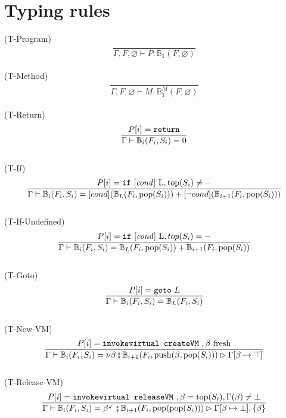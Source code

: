 \documentclass{amsart}
\newcommand{\bB}[1]{\mathbb{B}_{#1}}
\renewcommand{\emptyset}{\varnothing}
\numberwithin{equation}{section}
\theoremstyle{plain} %
\theoremstyle{definition}
\theoremstyle{remark}
\begin{document}
\section{Typing rules}
(T-Program)
\begin{equation*}
\frac{}
{\Gamma, F,\emptyset \vdash P: \bB{1}(F, \emptyset)}
\end{equation*}
\\
(T-Method)
\begin{equation*}
\frac{} %
{\Gamma, F,\emptyset \vdash M: \bB{1}^M(F, \emptyset)}
\end{equation*}
\\
(T-Return)
\begin{equation*}
\frac{P[i] = \text{\texttt{return}}}
{\Gamma \vdash \bB{i}(F_i, S_i) = 0}
\end{equation*}
\\
(T-If)
\begin{equation*}\frac{P[i] = \text{\texttt{if} [\emph{cond}] L}, \text{top}(S_i) \neq -}
{\Gamma \vdash \bB{i}(F_i, S_i) = [cond] (\bB{L}(F_i, \text{pop}(S_i))) +
 [\neg cond] (\bB{i+1}(F_i, \text{pop}(S_i)))}
\end{equation*}
\\
(T-If-Undefined)
\begin{equation*}\frac{P[i] = \text{\texttt{if} [\emph{cond}] L}, top(S_i) = -}
{\Gamma \vdash \bB{i}(F_i, S_i) = \bB{L}(F_i, \text{pop}(S_i)) + \bB{i+1}(F_i, \text{pop}(S_i))}
\end{equation*}
\\
(T-Goto)
\begin{equation*}
\frac{P[i] = \text{\texttt{goto} $L$}}
{\Gamma \vdash \bB{i}(F_i, S_i) = \bB{L}(F_i, S_i)}
\end{equation*}
\\
(T-New-VM)
\begin{equation*}\frac{
P[i] = \text{\texttt{invokevirtual createVM} }, \beta \text{ fresh}}
{\Gamma \vdash \bB{i}(F_i, S_i) = \nu \beta \fatsemi \bB{i+1}(F_i, \text{push}(\beta,\text{pop}(S_i))) \rhd \Gamma[\beta \mapsto \top]}
\end{equation*}
\\
(T-Release-VM)
\begin{equation*}
\frac{P[i] = \text{\texttt{invokevirtual releaseVM} }, \beta = \text{top}(S_i), \Gamma(\beta) \neq \bot}
{\Gamma \vdash \bB{i}(F_i, S_i) = \beta^{\checkmark} \fatsemi \bB{i+1}(F_i, \text{pop(pop}(S_i))) \rhd \Gamma[\beta \mapsto \bot], \{\beta\}}
\end{equation*}
\end{document}
